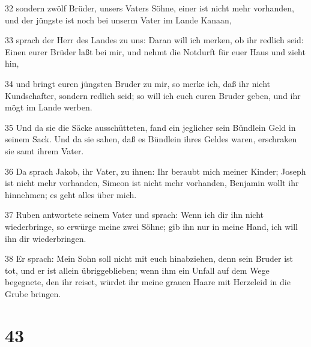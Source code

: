 \par 32 sondern zwölf Brüder, unsers Vaters Söhne, einer ist nicht mehr vorhanden, und der jüngste ist noch bei unserm Vater im Lande Kanaan,
\par 33 sprach der Herr des Landes zu uns: Daran will ich merken, ob ihr redlich seid: Einen eurer Brüder laßt bei mir, und nehmt die Notdurft für euer Haus und zieht hin,
\par 34 und bringt euren jüngsten Bruder zu mir, so merke ich, daß ihr nicht Kundschafter, sondern redlich seid; so will ich euch euren Bruder geben, und ihr mögt im Lande werben.
\par 35 Und da sie die Säcke ausschütteten, fand ein jeglicher sein Bündlein Geld in seinem Sack. Und da sie sahen, daß es Bündlein ihres Geldes waren, erschraken sie samt ihrem Vater.
\par 36 Da sprach Jakob, ihr Vater, zu ihnen: Ihr beraubt mich meiner Kinder; Joseph ist nicht mehr vorhanden, Simeon ist nicht mehr vorhanden, Benjamin wollt ihr hinnehmen; es geht alles über mich.
\par 37 Ruben antwortete seinem Vater und sprach: Wenn ich dir ihn nicht wiederbringe, so erwürge meine zwei Söhne; gib ihn nur in meine Hand, ich will ihn dir wiederbringen.
\par 38 Er sprach: Mein Sohn soll nicht mit euch hinabziehen, denn sein Bruder ist tot, und er ist allein übriggeblieben; wenn ihm ein Unfall auf dem Wege begegnete, den ihr reiset, würdet ihr meine grauen Haare mit Herzeleid in die Grube bringen.

\chapter{43}

